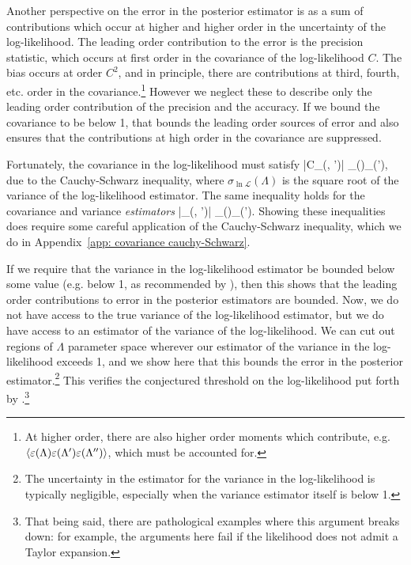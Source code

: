 Another perspective on the error in the posterior estimator is as a sum of contributions which occur at higher and higher order in the uncertainty of the log-likelihood. The leading order contribution to the error is the precision statistic, which occurs at first order in the covariance of the log-likelihood $C$. The bias occurs at order $C^2$, and in principle, there are contributions at third, fourth, etc. order in the covariance.\footnote{At higher order, there are also higher order moments which contribute, e.g. $\langle \varepsilon(\Lambda)\varepsilon(\Lambda')\varepsilon(\Lambda'')\rangle$, which must be accounted for.} 
However we neglect these to describe only the leading order contribution of the precision and the accuracy. If we bound the covariance to be below 1, that bounds the leading order sources of error and also ensures that the contributions at high order in the covariance are suppressed.

Fortunately, the covariance in the log-likelihood must satisfy
\beq
|C_{\ln{}}(\Lambda, \Lambda')| \le {} \equiv \sigma_{\ln{}}(\Lambda)\sigma_{\ln{}}(\Lambda'),
\label{eq: covariance Schwarz inequality}
\eeq
due to the Cauchy-Schwarz inequality, where $\sigma_{\ln\mathcal{L}}(\Lambda)$ is the square root of the variance of the log-likelihood estimator. The same inequality holds for the covariance and variance \textit{estimators}
\beq
|_{\ln{}}(\Lambda, \Lambda')| \le \hat{\sigma}_{\ln{}}(\Lambda)\hat{\sigma}_{\ln{}}(\Lambda').
\label{eq: covariance Schwarz inequality estimator}
\eeq
Showing these inequalities does require some careful application of the Cauchy-Schwarz inequality, which we do in Appendix~\ref{app: covariance cauchy-Schwarz}.

If we require that the variance in the log-likelihood estimator be bounded below some value (e.g. below 1, as recommended by \citet{Talbot:2023pex}), then this shows that the leading order contributions to error in the posterior estimators are bounded. Now, we do not have access to the true variance of the log-likelihood estimator, but we do have access to an estimator of the variance of the log-likelihood. We can cut out regions of $\Lambda$ parameter space wherever our estimator of the variance in the log-likelihood exceeds 1, and we show here that this bounds the error in the posterior estimator.\footnote{The uncertainty in the estimator for the variance in the log-likelihood is typically negligible, especially when the variance estimator itself is below 1.} This verifies the conjectured threshold on the log-likelihood put forth by \citet{Talbot:2023pex}.\footnote{That being said, there are pathological examples where this argument breaks down: for example, the arguments here fail if the likelihood does not admit a Taylor expansion.}

